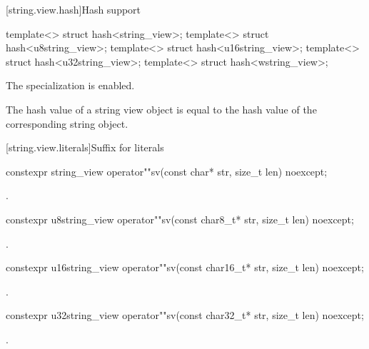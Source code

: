 [string.view.hash]{Hash support}

%
%
%
%
%
\begin{itemdecl}
template<> struct hash<string_view>;
template<> struct hash<u8string_view>;
template<> struct hash<u16string_view>;
template<> struct hash<u32string_view>;
template<> struct hash<wstring_view>;
\end{itemdecl}

\begin{itemdescr}
\pnum
The specialization is enabled.
\begin{note}
The hash value of a string view object is equal to the hash value of
the corresponding string object.
\end{note}
\end{itemdescr}

[string.view.literals]{Suffix for  literals}

%
\begin{itemdecl}
constexpr string_view operator""sv(const char* str, size_t len) noexcept;
\end{itemdecl}

\begin{itemdescr}
\pnum
\returns
{}.
\end{itemdescr}

%
\begin{itemdecl}
constexpr u8string_view operator""sv(const char8_t* str, size_t len) noexcept;
\end{itemdecl}
\begin{itemdescr}
\pnum
\returns
{}.
\end{itemdescr}

%
\begin{itemdecl}
constexpr u16string_view operator""sv(const char16_t* str, size_t len) noexcept;
\end{itemdecl}
\begin{itemdescr}
\pnum
\returns
{}.
\end{itemdescr}

%
\begin{itemdecl}
constexpr u32string_view operator""sv(const char32_t* str, size_t len) noexcept;
\end{itemdecl}
\begin{itemdescr}
\pnum
\returns
{}.
\end{itemdescr}

